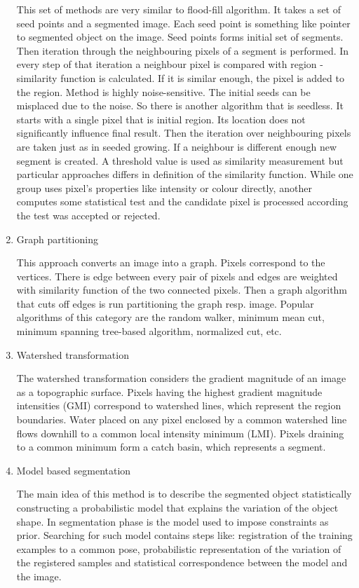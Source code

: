 \begin{enumerate}
  This set of methods are very similar to flood-fill algorithm.
It takes a set of seed points and a segmented image.
Each seed point is something like pointer to segmented object on the image.
Seed points forms initial set of segments.
Then iteration through the neighbouring pixels of a segment is performed.
In every step of that iteration a neighbour pixel is compared with region - similarity function is calculated.
If it is similar enough, the pixel is added to the region.
  Method is highly noise-sensitive.
The initial seeds can be misplaced due to the noise.
So there is another algorithm that is seedless.
It starts with a single pixel that is initial region.
Its location does not significantly influence final result.
Then the iteration over neighbouring pixels are taken just as in seeded growing.
If a neighbour is different enough new segment is created.
A threshold value is used as similarity measurement but particular approaches differs in definition of the similarity function.
While one group uses pixel's properties like intensity or colour directly, another computes some statistical test and the candidate pixel is processed according the test was accepted or rejected.

  \item Graph partitioning

  This approach converts an image into a graph.
Pixels correspond to the vertices.
There is edge between every pair of pixels and edges are weighted with similarity function of the two connected pixels.
Then a graph algorithm that cuts off edges is run partitioning the graph resp. image.
Popular algorithms of this category are the random walker, minimum mean cut, minimum spanning tree-based algorithm, normalized cut, etc.

  \item Watershed transformation

  The watershed transformation considers the gradient magnitude of an image as a topographic surface.
Pixels having the highest gradient magnitude intensities (GMI) correspond to watershed lines, which represent the region boundaries.
Water placed on any pixel enclosed by a common watershed line flows downhill to a common local intensity minimum (LMI).
Pixels draining to a common minimum form a catch basin, which represents a segment.

  \item Model based segmentation

  The main idea of this method is to describe the segmented object statistically constructing a probabilistic model that explains the variation of the object shape.
In segmentation phase is the model used to impose constraints as prior.
Searching for such model contains steps like: registration of the training examples to a common pose, probabilistic representation of the variation of the registered samples and statistical correspondence between the model and the image.


\end{enumerate}
